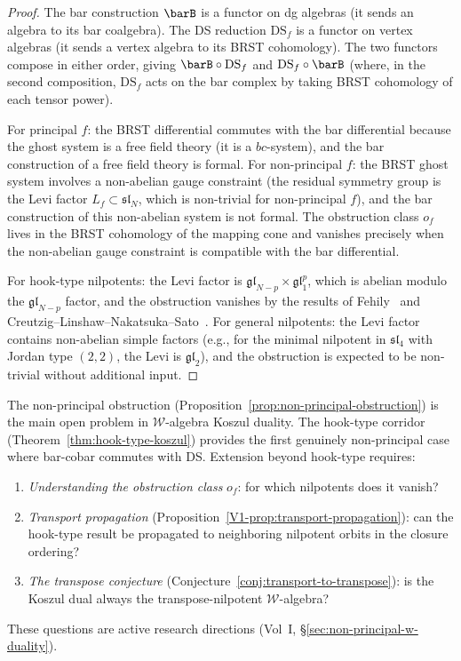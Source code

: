 \begin{proof}
The bar construction $\barB$ is a functor on dg algebras
(it sends an algebra to its bar coalgebra). The DS
reduction $\mathrm{DS}_f$ is a functor on vertex algebras
(it sends a vertex algebra to its BRST cohomology). The
two functors compose in either order, giving
$\barB\circ\mathrm{DS}_f$ and $\mathrm{DS}_f\circ\barB$
(where, in the second composition, $\mathrm{DS}_f$ acts
on the bar complex by taking BRST cohomology of each
tensor power).

For principal $f$: the BRST differential commutes with
the bar differential because the ghost system is a free
field theory (it is a $bc$-system), and the bar
construction of a free field theory is formal. For
non-principal $f$: the BRST ghost system involves a
non-abelian gauge constraint (the residual symmetry
group is the Levi factor $L_f\subset\mathfrak{sl}_N$,
which is non-trivial for non-principal $f$), and the
bar construction of this non-abelian system is not formal.
The obstruction class $o_f$ lives in the BRST cohomology
of the mapping cone and vanishes precisely when the
non-abelian gauge constraint is compatible with the
bar differential.

For hook-type nilpotents: the Levi factor is
$\mathfrak{gl}_{N-p}\times\mathfrak{gl}_1^p$, which is
abelian modulo the $\mathfrak{gl}_{N-p}$ factor, and the
obstruction vanishes by the results of
Fehily~\cite{Feh23} and
Creutzig--Linshaw--Nakatsuka--Sato~\cite{CLNS25}.
For general nilpotents: the Levi factor contains
non-abelian simple factors (e.g., for the minimal nilpotent
in $\mathfrak{sl}_4$ with Jordan type $(2,2)$, the Levi
is $\mathfrak{gl}_2$), and the obstruction is expected to
be non-trivial without additional input.
\end{proof}

\begin{remark}
The non-principal obstruction
(Proposition~\ref{prop:non-principal-obstruction}) is the
main open problem in $\mathcal{W}$-algebra Koszul duality.
The hook-type corridor
(Theorem~\ref{thm:hook-type-koszul}) provides the first
genuinely non-principal case where bar-cobar commutes with
DS. Extension beyond hook-type requires:
\begin{enumerate}[label=(\roman*)]
\item \emph{Understanding the obstruction class} $o_f$:
 for which nilpotents does it vanish?
\item \emph{Transport propagation}
 (Proposition~\ref{V1-prop:transport-propagation}):
 can the hook-type result be propagated to neighboring
 nilpotent orbits in the closure ordering?
\item \emph{The transpose conjecture}
 (Conjecture~\ref{conj:transport-to-transpose}):
 is the Koszul dual always the transpose-nilpotent
 $\mathcal{W}$-algebra?
\end{enumerate}
These questions are active research directions
(Vol~I, \S\ref*{sec:non-principal-w-duality}).
\end{remark}

